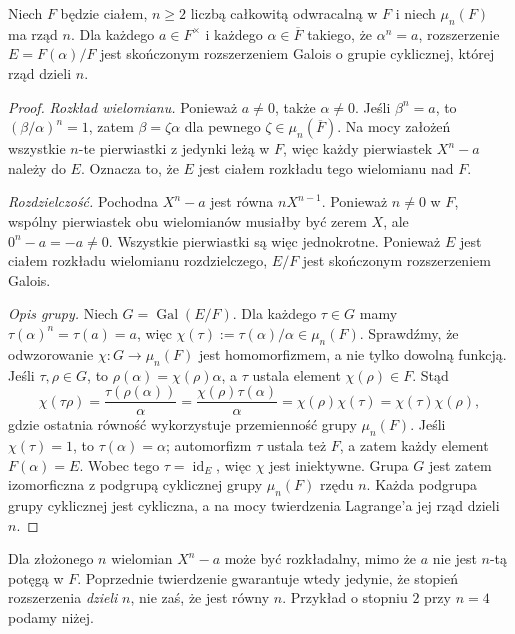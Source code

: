 \begin{twierdzenie}\label{aa:tw:kummer-radical-cyclic}
Niech $F$ będzie ciałem, $n\geq2$ liczbą całkowitą
odwracalną w $F$ i niech $\mu_n(F)$ ma rząd $n$.
Dla każdego $a\in F^\times$ i każdego $\alpha\in\overline F$
takiego, że $\alpha^n=a$, rozszerzenie $E=F(\alpha)/F$
jest skończonym rozszerzeniem Galois o grupie cyklicznej,
której rząd dzieli $n$.
\end{twierdzenie}
\begin{proof}
\emph{Rozkład wielomianu.}
Ponieważ $a\neq0$, także $\alpha\neq0$. Jeśli $\beta^n=a$,
to $(\beta/\alpha)^n=1$, zatem $\beta=\zeta\alpha$
dla pewnego $\zeta\in\mu_n(\overline F)$.
Na mocy założeń wszystkie $n$-te pierwiastki z jedynki
leżą w $F$, więc każdy pierwiastek $X^n-a$ należy do $E$.
Oznacza to, że $E$ jest ciałem rozkładu tego wielomianu nad $F$.

\emph{Rozdzielczość.}
Pochodna $X^n-a$ jest równa $nX^{n-1}$.
Ponieważ $n\neq0$ w $F$, wspólny pierwiastek obu wielomianów
musiałby być zerem $X$, ale $0^n-a=-a\neq0$.
Wszystkie pierwiastki są więc jednokrotne. Ponieważ $E$
jest ciałem rozkładu wielomianu rozdzielczego,
$E/F$ jest skończonym rozszerzeniem Galois.

\emph{Opis grupy.}
Niech $G=\operatorname{Gal}(E/F)$. Dla każdego $\tau\in G$
mamy $\tau(\alpha)^n=\tau(a)=a$, więc
$\chi(\tau):=\tau(\alpha)/\alpha\in\mu_n(F)$.
Sprawdźmy, że odwzorowanie $\chi:G\to\mu_n(F)$ jest
homomorfizmem, a nie tylko dowolną funkcją.
Jeśli $\tau,\rho\in G$, to $\rho(\alpha)=\chi(\rho)\alpha$,
a $\tau$ ustala element $\chi(\rho)\in F$. Stąd
\[
\chi(\tau\rho)=\frac{\tau(\rho(\alpha))}{\alpha}
=\frac{\chi(\rho)\tau(\alpha)}{\alpha}
=\chi(\rho)\chi(\tau)=\chi(\tau)\chi(\rho),
\]
gdzie ostatnia równość wykorzystuje przemienność grupy
$\mu_n(F)$. Jeśli $\chi(\tau)=1$, to $\tau(\alpha)=\alpha$;
automorfizm $\tau$ ustala też $F$, a zatem każdy element
$F(\alpha)=E$. Wobec tego $\tau=\operatorname{id}_E$,
więc $\chi$ jest iniektywne.
Grupa $G$ jest zatem izomorficzna z podgrupą cyklicznej grupy
$\mu_n(F)$ rzędu $n$. Każda podgrupa grupy cyklicznej
jest cykliczna, a na mocy twierdzenia Lagrange'a jej rząd
dzieli $n$.
\end{proof}

\begin{uwaga}
Dla złożonego $n$ wielomian $X^n-a$ może być rozkładalny,
mimo że $a$ nie jest $n$-tą potęgą w $F$.
Poprzednie twierdzenie gwarantuje wtedy jedynie, że stopień
rozszerzenia \emph{dzieli} $n$, nie zaś, że jest równy $n$.
Przykład o stopniu $2$ przy $n=4$ podamy niżej.
\end{uwaga}

